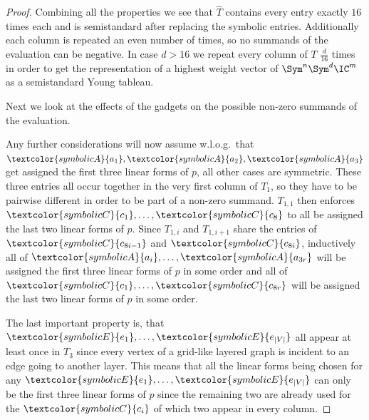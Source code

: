 \begin{proof}
    Combining all the properties we see that $\hat{T}$ contains every entry exactly $16$ times each and is semistandard after replacing the symbolic entries.
    Additionally each column is repeated an even number of times, so no summands of the evaluation can be negative.
    In case $d > 16$ we repeat every column of $T$ $\frac{d}{16}$ times in order to get the representation of a highest weight vector of $\Sym^n\Sym^d \IC^m$ as a semistandard Young tableau.
    
    Next we look at the effects of the gadgets on the possible non-zero summands of the evaluation.
    
    Any further considerations will now assume w.l.o.g.\ that $\textcolor{symbolicA}{a_1}, \textcolor{symbolicA}{a_2}, \textcolor{symbolicA}{a_3}$ get assigned the first three linear forms of $p$, all other cases are symmetric.
    These three entries all occur together in the very first column of $T_1$, so they have to be pairwise different in order to be part of a non-zero summand.
    $T_{1,1}$ then enforces $\textcolor{symbolicC}{c_1}, \ldots, \textcolor{symbolicC}{c_8}$ to all be assigned the last two linear forms of $p$.
    Since $T_{1, i}$ and $T_{1, i+1}$ share the entries of $\textcolor{symbolicC}{c_{8i-1}}$ and $\textcolor{symbolicC}{c_{8i}}$, inductively all of $\textcolor{symbolicA}{a_i}, \ldots, \textcolor{symbolicA}{a_{3r}}$ will be assigned the first three linear forms of $p$ in some order and all of $\textcolor{symbolicC}{c_1}, \ldots, \textcolor{symbolicC}{c_{8r}}$ will be assigned the last two linear forms of $p$ in some order.

    The last important property is, that $\textcolor{symbolicE}{e_1}, \ldots, \textcolor{symbolicE}{e_{|V|}}$ all appear at least once in $T_3$ since every vertex of a grid-like layered graph is incident to an edge going to another layer.
    This means that all the linear forms being chosen for any $\textcolor{symbolicE}{e_1}, \ldots, \textcolor{symbolicE}{e_{|V|}}$ can only be the first three linear forms of $p$ since the remaining two are already used for the $\textcolor{symbolicC}{c_i}$ of which two appear in every column.


\end{proof}
